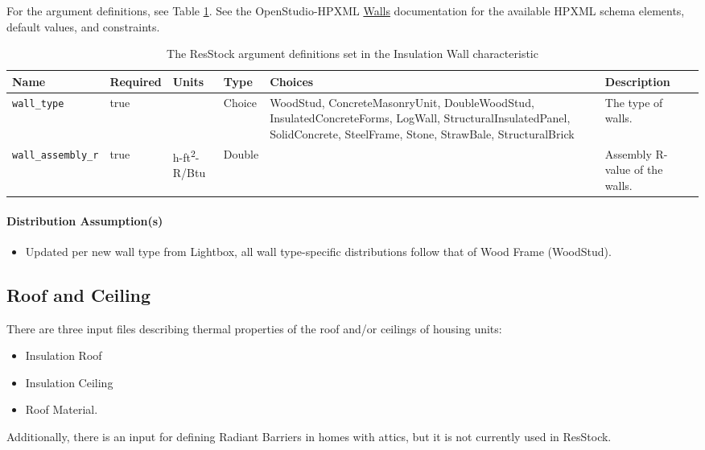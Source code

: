 For the argument definitions, see Table \ref{table:hc_arg_def_ins_wall}. See the OpenStudio-HPXML \href{https://openstudio-hpxml.readthedocs.io/en/v1.8.1/workflow_inputs.html#hpxml-walls}{Walls} documentation for the available HPXML schema elements, default values, and constraints.
\begin{longtable}[]{|p{3.5cm}|p{1.5cm}|p{1.3cm}|p{1.1cm}|p{}|p{3.3cm}|}
\caption{The ResStock argument definitions set in the Insulation Wall characteristic} \label{table:hc_arg_def_ins_wall} \\
\toprule\noalign{}
Name & Required & Units & Type & Choices & Description \\
\midrule\noalign{}
\endhead
\bottomrule\noalign{}
\endlastfoot
\texttt{wall\_type} & true & & Choice & WoodStud, ConcreteMasonryUnit,
DoubleWoodStud, InsulatedConcreteForms, LogWall,
StructuralInsulatedPanel, SolidConcrete, SteelFrame, Stone, StrawBale,
StructuralBrick & The type of walls. \\
\hline
\texttt{wall\_assembly\_r} & true & h-ft\textsuperscript{2}-R/Btu & Double & &
Assembly R-value of the walls. \\
\end{longtable}
\paragraph{Distribution Assumption(s)}
\begin{itemize}
 
\item
  Updated per new wall type from Lightbox, all wall type-specific
  distributions follow that of {Wood Frame} ({WoodStud}).
\end{itemize}
\subsection{Roof and Ceiling}

There are three input files describing thermal properties of the roof and/or ceilings of housing units:
\begin{itemize}
    \item Insulation Roof
    \item Insulation Ceiling
    \item Roof Material.
\end{itemize}

Additionally, there is an input for defining Radiant Barriers in homes with attics, but it is not currently used in ResStock.

